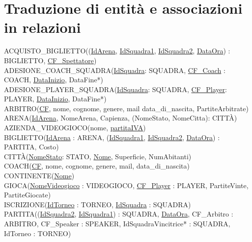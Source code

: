 \documentclass[a4paper,12pt]{report}
\begin{document}
\section{Traduzione di entità e associazioni in relazioni}

ACQUISTO\_BIGLIETTO((\underline{IdArena}, \underline{IdSquadra1}, \underline{IdSquadra2}, \underline{DataOra}) : BIGLIETTO, \underline{CF\_Spettatore}) \\

\noindent ADESIONE\_COACH\_SQUADRA(\underline{IdSquadra}: SQUADRA, \underline{CF\_Coach} : COACH, \underline{DataInizio}, DataFine*) \\

\noindent ADESIONE\_PLAYER\_SQUADRA(\underline{IdSquadra}: SQUADRA, \underline{CF\_Player}: PLAYER, \underline{DataInizio}, DataFine*) \\

\noindent ARBITRO(\underline{CF}, nome, cognome, genere, mail data\_di\_nascita, PartiteArbitrate) \\

\noindent ARENA(\underline{IdArena}, NomeArena, Capienza, (NomeStato, NomeCitta): CITTÀ) \\

\noindent AZIENDA\_VIDEOGIOCO(nome, \underline{partitaIVA}) \\

\noindent BIGLIETTO(\underline{IdArena} : ARENA, (\underline{IdSquadra1}, \underline{IdSquadra2}, \underline{DataOra}) : PARTITA, Costo) \\

\noindent CITTÀ(\underline{NomeStato}: STATO, \underline{Nome}, Superficie, NumAbitanti) \\

\noindent COACH(\underline{CF}, nome, cognome, genere, mail, data\_di\_nascita) \\

\noindent CONTINENTE(\underline{Nome}) \\

\noindent GIOCA(\underline{NomeVideogioco} : VIDEOGIOCO, \underline{CF\_Player} : PLAYER, PartiteVinte, PartiteGiocate) \\

\noindent ISCRIZIONE(\underline{IdTorneo} : TORNEO, \underline{IdSquadra} : SQUADRA) \\

\noindent PARTITA((\underline{IdSquadra2}, \underline{IdSquadra1}) : SQUADRA, \underline{DataOra}, CF\_Arbitro : ARBITRO, CF\_Speaker : SPEAKER, IdSquadraVincitrice* : SQUADRA, IdTorneo : TORNEO) \\
\end{document}
